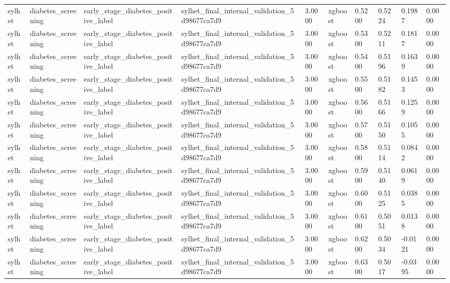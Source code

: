 \begin{tabular}{llllllllll}
sylhet & diabetes\_screening & early\_stage\_diabetes\_positive\_label & sylhet\_final\_internal\_validation\_5d98677ca7d9 & 3.0000 & xgboost & 0.5200 & 0.5224 & 0.1987 & 0.0000 \\
sylhet & diabetes\_screening & early\_stage\_diabetes\_positive\_label & sylhet\_final\_internal\_validation\_5d98677ca7d9 & 3.0000 & xgboost & 0.5300 & 0.5211 & 0.1817 & 0.0000 \\
sylhet & diabetes\_screening & early\_stage\_diabetes\_positive\_label & sylhet\_final\_internal\_validation\_5d98677ca7d9 & 3.0000 & xgboost & 0.5400 & 0.5196 & 0.1639 & 0.0000 \\
sylhet & diabetes\_screening & early\_stage\_diabetes\_positive\_label & sylhet\_final\_internal\_validation\_5d98677ca7d9 & 3.0000 & xgboost & 0.5500 & 0.5182 & 0.1453 & 0.0000 \\
sylhet & diabetes\_screening & early\_stage\_diabetes\_positive\_label & sylhet\_final\_internal\_validation\_5d98677ca7d9 & 3.0000 & xgboost & 0.5600 & 0.5166 & 0.1259 & 0.0000 \\
sylhet & diabetes\_screening & early\_stage\_diabetes\_positive\_label & sylhet\_final\_internal\_validation\_5d98677ca7d9 & 3.0000 & xgboost & 0.5700 & 0.5150 & 0.1055 & 0.0000 \\
sylhet & diabetes\_screening & early\_stage\_diabetes\_positive\_label & sylhet\_final\_internal\_validation\_5d98677ca7d9 & 3.0000 & xgboost & 0.5800 & 0.5114 & 0.0842 & 0.0000 \\
sylhet & diabetes\_screening & early\_stage\_diabetes\_positive\_label & sylhet\_final\_internal\_validation\_5d98677ca7d9 & 3.0000 & xgboost & 0.5900 & 0.5140 & 0.0619 & 0.0000 \\
sylhet & diabetes\_screening & early\_stage\_diabetes\_positive\_label & sylhet\_final\_internal\_validation\_5d98677ca7d9 & 3.0000 & xgboost & 0.6000 & 0.5125 & 0.0385 & 0.0000 \\
sylhet & diabetes\_screening & early\_stage\_diabetes\_positive\_label & sylhet\_final\_internal\_validation\_5d98677ca7d9 & 3.0000 & xgboost & 0.6100 & 0.5051 & 0.0138 & 0.0000 \\
sylhet & diabetes\_screening & early\_stage\_diabetes\_positive\_label & sylhet\_final\_internal\_validation\_5d98677ca7d9 & 3.0000 & xgboost & 0.6200 & 0.5034 & -0.0121 & 0.0000 \\
sylhet & diabetes\_screening & early\_stage\_diabetes\_positive\_label & sylhet\_final\_internal\_validation\_5d98677ca7d9 & 3.0000 & xgboost & 0.6300 & 0.5017 & -0.0395 & 0.0000 \\

\end{tabular}
